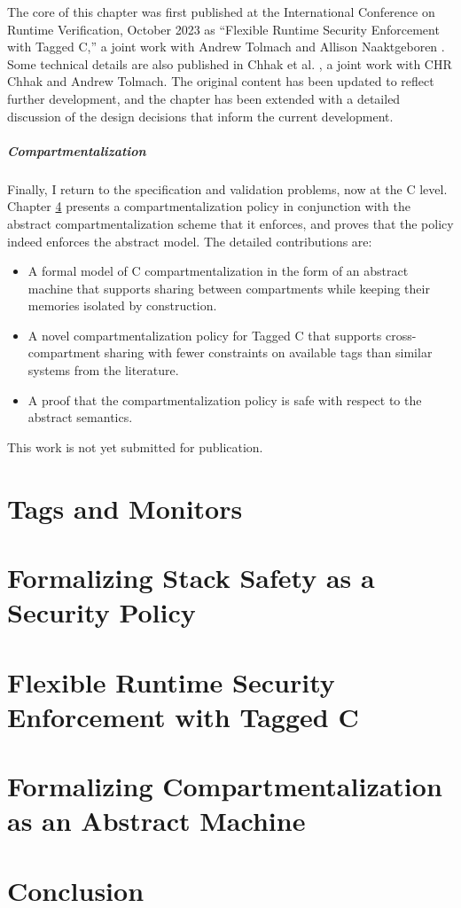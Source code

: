 \documentclass{report}
\begin{document}
The core of this chapter was first published at the International Conference on Runtime Verification,
October 2023 as ``Flexible Runtime Security Enforcement with Tagged C,'' a joint work
with Andrew Tolmach and Allison Naaktgeboren \cite{Anderson23:TaggedC}. Some technical
details are also published in Chhak et al. \cite{}, a joint work with CHR Chhak and Andrew Tolmach.
The original content has been updated to reflect further development, and the chapter has been
extended with a detailed discussion of the design decisions that inform the current development.

\paragraph{Compartmentalization}

Finally, I return to the specification and validation problems, now at the C level. Chapter
\ref{ch:compartments} presents a compartmentalization policy in conjunction with the abstract
compartmentalization scheme that it enforces, and proves that the policy indeed enforces the
abstract model. The detailed contributions are:

\begin{itemize}
\item A formal model of C compartmentalization in the form of an abstract machine that
  supports sharing between compartments while keeping their memories isolated by construction.
\item A novel compartmentalization policy for Tagged C that supports cross-compartment
  sharing with fewer constraints on available tags than similar systems from the literature.
\item A proof that the compartmentalization policy is safe with respect to the abstract semantics.
\end{itemize}

This work is not yet submitted for publication.

\chapter{Tags and Monitors}
\label{ch:background}

\chapter{Formalizing Stack Safety as a Security Policy}
\label{ch:stacksafety}

\chapter{Flexible Runtime Security Enforcement with Tagged C}
\label{ch:taggedc}

\chapter{Formalizing Compartmentalization as an Abstract Machine}
\label{ch:compartments}

\chapter{Conclusion}



\end{document}
